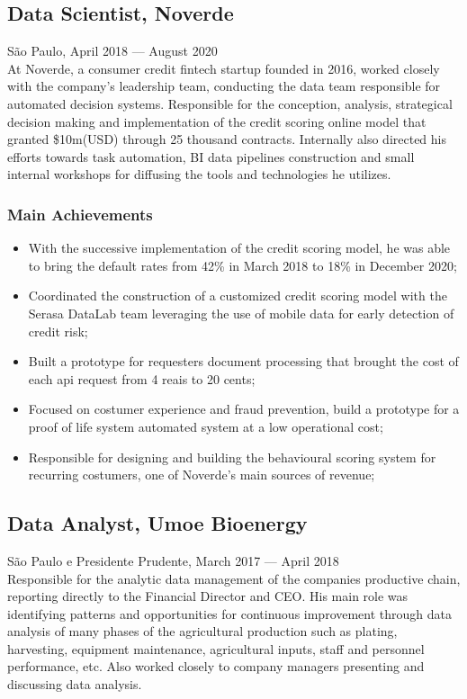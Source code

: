 \documentclass{article}
\newcommand{\jobdate}[3]{
\large
\vspace{0.05em} 
  {#1, #2 --- #3}
\vspace{0.5em} 
\\
}
\begin{document}
\subsection{Data Scientist, Noverde}
\jobdate{São Paulo}{April 2018}{August 2020}
At Noverde, a consumer credit fintech startup founded in 2016, worked closely with the company's leadership team, conducting the data team responsible for automated decision systems. Responsible for the conception, analysis, strategical decision making and implementation of the credit scoring online model that granted \$10m(USD) through 25 thousand contracts. Internally also directed his efforts towards task automation, BI data pipelines construction and small internal workshops for diffusing the tools and technologies he utilizes.
\subsubsection{Main Achievements}

\begin{itemize}

\item{With the successive implementation of the credit scoring model, he was able to bring the default rates from 42\% in March 2018 to 18\% in December 2020;}
\item{Coordinated the construction of a customized credit scoring model with the Serasa DataLab team leveraging the use of mobile data for early detection of credit risk;}
\item{Built a prototype for requesters document processing that brought the cost of each api request from 4 reais to 20 cents;}
\item{Focused on costumer experience and fraud prevention, build a prototype for a proof of life system automated system at a low operational cost;}
\item{Responsible for designing and building the behavioural scoring system for recurring costumers, one of Noverde's main sources of revenue;}
\end{itemize}

\subsection{Data Analyst, Umoe Bioenergy}
\jobdate{São Paulo e Presidente Prudente}{March 2017}{April 2018}
Responsible for the analytic data management of the companies productive chain, reporting directly to the Financial Director and CEO. His main role was identifying patterns and opportunities for continuous improvement through data analysis of many phases of the agricultural production such as plating, harvesting, equipment maintenance, agricultural inputs, staff and personnel performance, etc. Also worked closely to company managers presenting and discussing data analysis.
\end{document}
